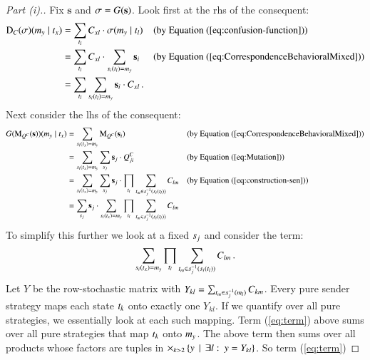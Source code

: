 \documentclass[fleqn,reqno,10pt]{article}
\renewcommand{\Smixed}{\ensuremath{\mathrm{\mathbf{s}}}}
\newcommand{\Diff}{\ensuremath{\mathrm{D}}} %
\newcommand{\Mutate}{\ensuremath{\mathrm{M}}} %
\begin{document}
\begin{proof}[Part (i).]
  Fix $\Smixed$ and $\Sstrat = G(\Smixed)$. Look first at the rhs of
  the consequent:
  \begin{align*}
    \Diff_C(\Sstrat)(\messg_y \probbar \state_x) & =  \sum_{\state_l} C_{xl}
    \cdot \Sstrat(\messg_y \probbar \state_l) && \text{(by Equation~(\ref{eq:confusion-function}))} \\
    & =  \sum_{\state_l} C_{xl}
    \cdot  \sum_{\Spure_i(\state_l) = \messg_y} \Smixed_i && \text{(by Equation~(\ref{eq:CorrespondenceBehavioralMixed}))} \\
    & = \sum_{\state_l}
    \sum_{\Spure_i(\state_l) = \messg_y} \Smixed_i \cdot C_{xl}\,.
  \end{align*}
  Next consider the lhs of the consequent:
  \begin{align*}
    G(\Mutate_{Q^C}(\Smixed))(\messg_y \probbar \state_x) & =
    \sum_{\Spure_i(\state_x)=\messg_y} \Mutate_{Q^C}(\Smixed_i) &&
    \text{(by Equation~(\ref{eq:CorrespondenceBehavioralMixed}))} \\
    & = \sum_{\Spure_i(\state_x)=\messg_y} \sum_{\Spure_j}
    \Smixed_j \cdot Q^C_{ji} &&
    \text{(by Equation~(\ref{eq:Mutation}))} \\
    & = \sum_{\Spure_i(\state_x)=\messg_y} \sum_{\Spure_j}
    \Smixed_j \cdot \prod_{\state_l} \sum_{\state_m \in
      \Spure_j^{-1}(\Spure_i(\state_l))} C_{lm} &&
    \text{(by Equation~(\ref{eq:construction-sen}))} \\
    & = \sum_{\Spure_j} \Smixed_j \cdot
    \sum_{\Spure_i(\state_x)=\messg_y} \prod_{\state_l}
    \sum_{\state_m \in \Spure_j^{-1}(\Spure_i(\state_l))} C_{lm}
  \end{align*}
  To simplify this further we look at a fixed $s_j$ and consider
  the term: 
  \begin{align}
    \label{eq:term}
    \sum_{s_i(t_x)=m_y} \prod_{t_l} \sum_{t_m
      \in s_j^{-1}(s_i(t_l))} C_{lm}\,.
  \end{align}
  Let $Y$ be the row-stochastic matrix with $Y_{kl} = \sum_{t_m
    \in s_j^{-1}(m_l)} C_{km}$. Every pure sender strategy
  maps each state $t_k$ onto exactly one $Y_{kl}$. If we quantify
  over all pure strategies, we essentially look at each such
  mapping. Term (\ref{eq:term}) above sums over all pure strategies
  that map $t_k$ onto $m_y$. The above term then sums over
  all products whose factors are tuples in $\times_{k>2} \left\{y
    \thinspace \mid \thinspace \exists l \thinspace \colon \thinspace y = Y_{kl}\right\}$. So term (\ref{eq:term})

\end{proof}
\end{document}
